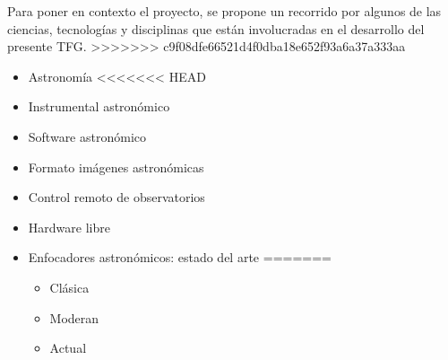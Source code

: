 \newpage
\bigskip
Para poner en contexto el proyecto, se  propone un recorrido por algunos de las ciencias, tecnologías y disciplinas que están involucradas en el desarrollo del presente TFG.
>>>>>>> c9f08dfe66521d4f0dba18e652f93a6a37a333aa

\begin{itemize}

  \item {Astronomía}
<<<<<<< HEAD

  \item {Instrumental astronómico}
%       
  \item {Software astronómico}
  \item {Formato imágenes astronómicas}
  
  \item {Control remoto de observatorios}
  
  \item {Hardware libre}
   
   \item {Enfocadores astronómicos: estado del arte}
=======
   \begin{itemize}
	   \item{Clásica}
	   \item{Moderan}
	   \item{Actual}	 
	\end{itemize}


\end{itemize}

